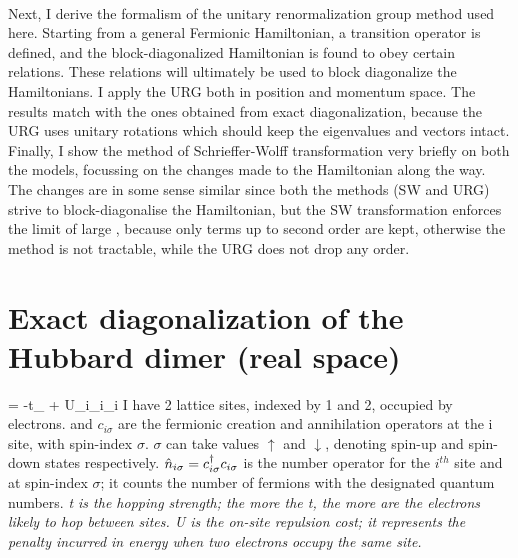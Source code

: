\documentclass[12pt]{article}
\begin{document}
\paragraph{}
Next, I derive the formalism of the unitary renormalization group method used here. Starting from a general Fermionic Hamiltonian, a transition operator \il{\eta} is defined, and the block-diagonalized Hamiltonian is found to obey certain relations. These relations will ultimately be used to block diagonalize the Hamiltonians. I apply the URG both in position and momentum space. The results match with the ones obtained from exact diagonalization, because the URG uses unitary rotations which should keep the eigenvalues and vectors intact. Finally, I show the method of Schrieffer-Wolff transformation very briefly on both the models, focussing on the changes made to the Hamiltonian along the way. The changes are in some sense similar since both the methods (SW and URG) strive to block-diagonalise the Hamiltonian, but the SW transformation enforces the limit of large , because only terms up to second order are kept, otherwise the method is not tractable, while the URG does not drop any order.

\newpage
\section{Exact diagonalization of the Hubbard dimer (real space)}

\beq
\ham = -t\sum_\sigma{} + U\sum_i_{i\uparrow}_{i\downarrow}
\eeq
I have 2 lattice sites, indexed by 1 and 2, occupied by electrons.  and \(c_{i\sigma}\) are the fermionic creation and annihilation operators at the i site, with spin-index \(\sigma\). \(\sigma\) can take values \(\uparrow\) and \(\downarrow\), denoting spin-up and spin-down states respectively. \(\hat{n}_{i\sigma}=c_{{i}{\sigma}}^\dagger c_{{i}{\sigma}}\) is the number operator for the \(i^{th}\) site and at spin-index \(\sigma\); it counts the number of fermions with the designated quantum numbers.  \it t is the hopping strength; the more the t, the more are the electrons likely to hop between sites. \it U is the on-site repulsion cost; it represents the penalty incurred in energy when two electrons occupy the same site.
\end{document}
